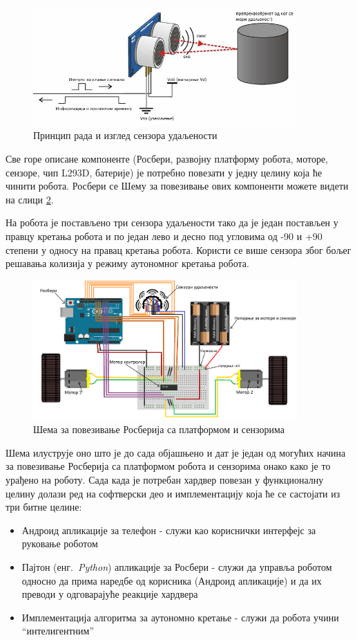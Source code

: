 \documentclass[12pt,oneside]{memoir}
\theoremstyle{remark}
\begin{document}
\begin{figure}[!ht]
\centering
\includegraphics[width=0.9\textwidth]{slike/UltrasonicSensors.jpg}
\caption{Принцип рада и изглед сензора удаљености }
\label{fig:ultrasonicsensor}
\end{figure}

Све горе описане компоненте (Росбери, развојну платформу робота, моторе, сензоре, чип L293D, батерије) је потребно повезати у једну целину која ће чинити робота. Росбери се Шему за повезивање ових компоненти можете видети на слици \ref{fig:mainshema}.

На робота је постављено три сензора удаљености тако да је један постављен у правцу кретања робота и по један лево и десно под угловима од -90 и +90 степени у односу на правац кретања робота. Користи се више сензора због бољег решавања колизија у режиму аутономног кретања робота.

\begin{figure}[!ht]
\centering
\includegraphics[width=0.9\textwidth]{slike/shema.png}
\caption{Шема за повезивање Росберија са платформом и сензорима }
\label{fig:mainshema}
\end{figure}

Шема илуструје оно што је до сада објашњено и дат је један од могућих начина за повезивање Росберија са платформом робота и сензорима онако како је то урађено на роботу. Сада када је потребан хардвер повезан у функционалну целину долази ред на софтверски део и имплементацију која ће се састојати из три битне целине:
\begin{itemize}
\item Андроид апликације за телефон - служи као кориснички интерфејс за руковање роботом
\item Пајтон  (енг.~{\em Python}) апликације за Росбери - служи да управља роботом односно да прима наредбе од корисника (Андроид апликације) и да их преводи у одговарајуће реакције хардвера
\item Имплементација алгоритма за аутономно кретање - служи да робота учини ``интелигентним''
\end{itemize}
\end{document}
